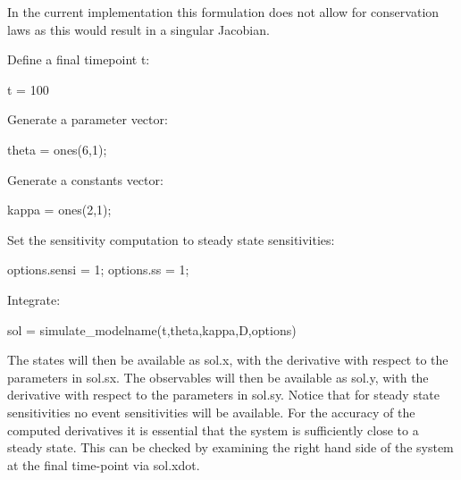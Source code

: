 In the current implementation this formulation does not allow for conservation laws as this would result in a singular Jacobian.

Define a final timepoint t\+:


\begin{DoxyCode}
t = 100
\end{DoxyCode}


Generate a parameter vector\+:


\begin{DoxyCode}
theta = ones(6,1);
\end{DoxyCode}


Generate a constants vector\+:


\begin{DoxyCode}
kappa = ones(2,1);
\end{DoxyCode}


Set the sensitivity computation to steady state sensitivities\+:


\begin{DoxyCode}
options.sensi = 1;
options.ss = 1;
\end{DoxyCode}


Integrate\+:


\begin{DoxyCode}
sol = simulate\_modelname(t,theta,kappa,D,options)
\end{DoxyCode}


The states will then be available as sol.\+x, with the derivative with respect to the parameters in sol.\+sx. The observables will then be available as sol.\+y, with the derivative with respect to the parameters in sol.\+sy. Notice that for steady state sensitivities no event sensitivities will be available. For the accuracy of the computed derivatives it is essential that the system is sufficiently close to a steady state. This can be checked by examining the right hand side of the system at the final time-\/point via sol.\+xdot. 